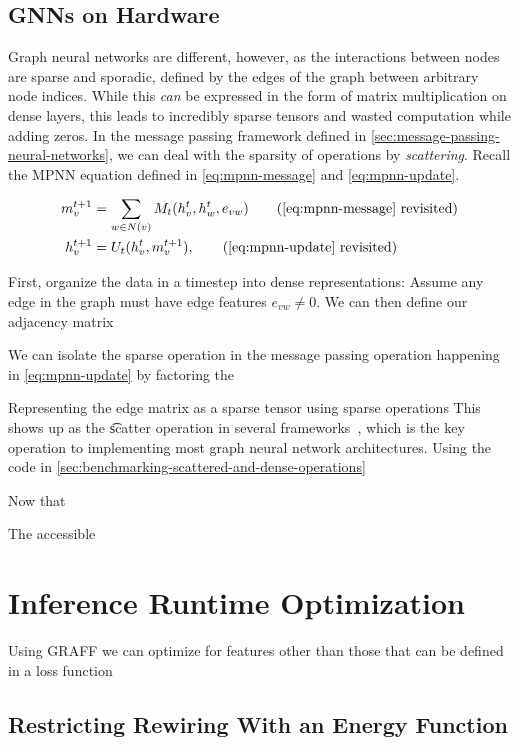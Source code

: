 \documentclass[../main.tex]{subfiles}
\begin{document}
    \subsection{GNNs on Hardware}\label{subsec:gnns-on-hardware}
    Graph neural networks are different, however, as the interactions between nodes are sparse and sporadic, defined by the edges of the graph between arbitrary node indices.
    While this \textit{can} be expressed in the form of matrix multiplication on dense layers, this leads to incredibly sparse tensors and wasted computation while adding zeros.
    In the message passing framework defined in \autoref{sec:message-passing-neural-networks}, we can deal with the sparsity of operations by \textit{scattering}.
    Recall the MPNN equation defined in \autoref{eq:mpnn-message} and \autoref{eq:mpnn-update}.

    \begin{align*}
        m^{t+1}_v &= \sum_{w \in N(v)} M_t(h^t_v, h^t_w, e_{vw})\tag{\ref{eq:mpnn-message} revisited}\\
        h^{t+1}_v &= U_t(h_v^t, m_v^{t + 1}),\tag{\ref{eq:mpnn-update} revisited}
    \end{align*}

    First, organize the data in a timestep into dense representations: Assume any edge in the graph must have edge features $e_{vw} \neq 0$.
    We can then define our adjacency matrix

    We can isolate the sparse operation in the message passing operation happening in \autoref{eq:mpnn-update} by factoring the

    Representing the edge matrix as a sparse tensor using sparse operations
    This shows up as the \t{scatter} operation in several frameworks~\cite{TorchTensorScatter, JaxLaxScatter}, which is the key operation to implementing most graph neural network architectures.
    Using the code in \autoref{sec:benchmarking-scattered-and-dense-operations}


    Now that

    The accessible

    \section{Inference Runtime Optimization}\label{sec:inference-runtime-optimization}
    Using GRAFF we can optimize for features other than those that can be defined in a loss function

    \subsection{Restricting Rewiring With an Energy Function}\label{subsec:runtime-energy}
\end{document}
